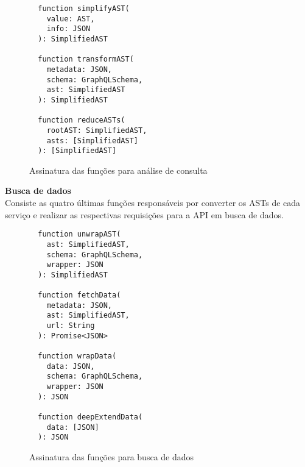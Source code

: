 \begin{figure}[H]
  \centering
  \begin{verbatim}
  function simplifyAST(
    value: AST,
    info: JSON
  ): SimplifiedAST

  function transformAST(
    metadata: JSON,
    schema: GraphQLSchema,
    ast: SimplifiedAST
  ): SimplifiedAST

  function reduceASTs(
    rootAST: SimplifiedAST,
    asts: [SimplifiedAST]
  ): [SimplifiedAST]
  \end{verbatim}
  \caption{Assinatura das funções para análise de consulta}
\end{figure}

\textbf{Busca de dados} \\

Consiste as quatro últimas funções responsáveis por converter os ASTs de cada serviço e realizar as respectivas requisições para a API em busca de dados.

\begin{figure}[H]
  \centering
  \begin{verbatim}
  function unwrapAST(
    ast: SimplifiedAST,
    schema: GraphQLSchema,
    wrapper: JSON
  ): SimplifiedAST

  function fetchData(
    metadata: JSON,
    ast: SimplifiedAST,
    url: String
  ): Promise<JSON>

  function wrapData(
    data: JSON,
    schema: GraphQLSchema,
    wrapper: JSON
  ): JSON
  
  function deepExtendData(
    data: [JSON]
  ): JSON
  \end{verbatim}
  \caption{Assinatura das funções para busca de dados}
\end{figure}
